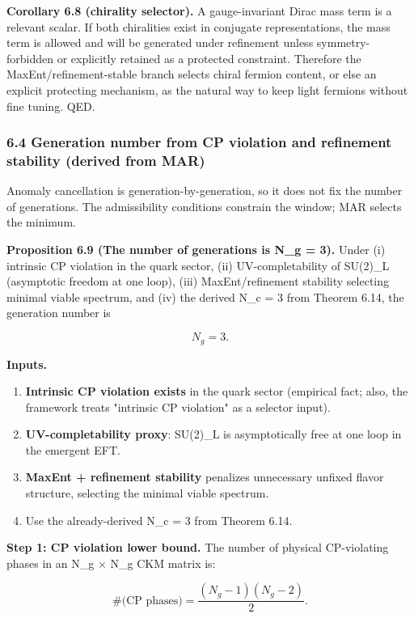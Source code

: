 \textbf{Corollary 6.8 (chirality selector).} A gauge-invariant Dirac mass term is a relevant scalar. If both chiralities exist in conjugate representations, the mass term is allowed and will be generated under refinement unless symmetry-forbidden or explicitly retained as a protected constraint. Therefore the MaxEnt/refinement-stable branch selects chiral fermion content, or else an explicit protecting mechanism, as the natural way to keep light fermions without fine tuning. QED.

\subsubsection{6.4 Generation number from CP violation and refinement stability (derived from MAR)}\label{64-generation-number-from-cp-violation-and-refinement-stability-derived-from-mar}

Anomaly cancellation is generation-by-generation, so it does not fix the number of generations. The admissibility conditions constrain the window; MAR selects the minimum.

\textbf{Proposition 6.9 (The number of generations is N\_g = 3).} Under (i) intrinsic CP violation in the quark sector, (ii) UV-completability of SU(2)\_L (asymptotic freedom at one loop), (iii) MaxEnt/refinement stability selecting minimal viable spectrum, and (iv) the derived N\_c = 3 from Theorem 6.14, the generation number is

\[
N_g = 3.
\]

\textbf{Inputs.}

\begin{enumerate}
\def\labelenumi{\arabic{enumi}.}
\tightlist
\item
  \textbf{Intrinsic CP violation exists} in the quark sector (empirical fact; also, the framework treats "intrinsic CP violation" as a selector input).
\item
  \textbf{UV-completability proxy}: SU(2)\_L is asymptotically free at one loop in the emergent EFT.
\item
  \textbf{MaxEnt + refinement stability} penalizes unnecessary unfixed flavor structure, selecting the minimal viable spectrum.
\item
  Use the already-derived N\_c = 3 from Theorem 6.14.
\end{enumerate}

\textbf{Step 1: CP violation lower bound.} The number of physical CP-violating phases in an N\_g × N\_g CKM matrix is:

\[
\#\text{(CP phases)} = \frac{(N_g - 1)(N_g - 2)}{2}.
\]


